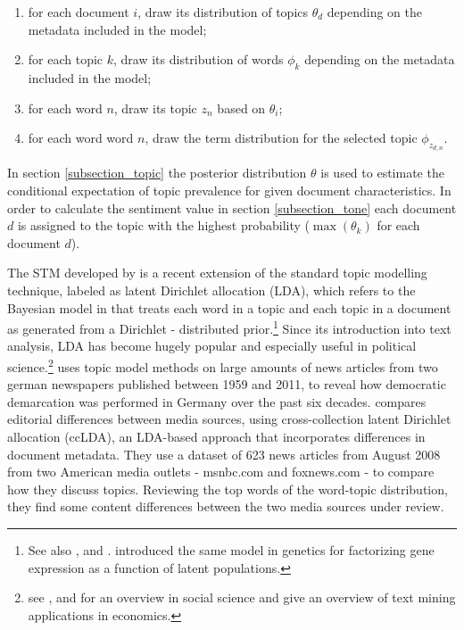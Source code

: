 \documentclass[12pt,a4paper,notitlepage]{article}
\begin{document}
\begin{enumerate}
	\item for each document $i$, draw its distribution of topics $\theta_d$ depending on the metadata included in the model; 
	\item for each topic $k$, draw its distribution of words $\phi_k$ depending on the metadata included in the model;
	\item for each word $n$, draw its topic $z_n$ based on $\theta_i$;
	\item for each word word $n$, draw the term distribution for the selected topic $\phi_{z_{d,n}}$.
\end{enumerate}

In section \ref{subsection_topic} the posterior distribution $\theta$ is used to estimate the conditional expectation of topic prevalence for given document characteristics. In order to calculate the sentiment value in section \ref{subsection_tone} each document $d$ is assigned to the topic with the highest probability ($\max (\theta_{k})$ for each document $d$).

The STM developed by \citet{roberts_model_2016} is a recent extension of the standard topic modelling technique, labeled as latent Dirichlet allocation (LDA), which refers to the Bayesian model in \citet{blei_latent_2003} that treats each word in a topic and each topic in a document as generated from a Dirichlet - distributed prior.\footnote{See also \citet{griffiths_probabilistic_2002}, \citet{griffiths_finding_2004} and \citet{hofmann_probabilistic_1999}. \citet{pritchard_inference_2000} introduced the same model in genetics for factorizing gene expression as a function of latent populations.} Since its introduction into text analysis, LDA has become hugely popular and especially useful in political science.\footnote{see \citet{blei_probabilistic_2012}, \citet{grimmer_text_2013} and \citet{wiedmann_text_2016} for an overview in social science and \citet{gentzkow_text_2017} give an overview of text mining applications in economics.} \citet{wiedmann_text_2016} uses topic model methods on large amounts of news articles from two german newspapers published between 1959 and 2011, to reveal how democratic demarcation was performed in Germany over the past six decades. \citet{paul_cross-collection_2009} compares editorial differences between media sources, using cross-collection latent Dirichlet allocation (ccLDA), an LDA-based approach that incorporates differences in document metadata. They use a dataset of 623 news articles from August 2008 from two American media outlets - msnbc.com and foxnews.com - to compare how they discuss topics. Reviewing the top words of the word-topic distribution, they find some content differences between the two media sources under review. 
\end{document}
